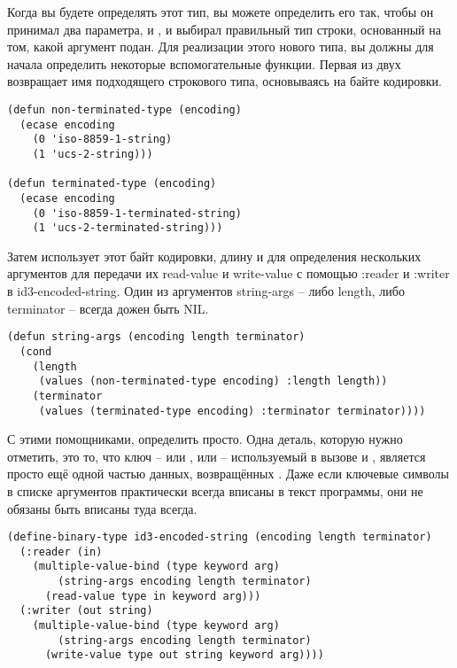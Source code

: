 Когда вы будете определять этот тип, вы можете определить его так, чтобы он принимал два
параметра,  и , и выбирал правильный тип строки,
основанный на том, какой аргумент подан. Для реализации этого нового типа, вы должны для
начала определить некоторые вспомогательные функции. Первая из двух возвращает имя
подходящего строкового типа, основываясь на байте кодировки.

\begin{lstlisting}
(defun non-terminated-type (encoding)
  (ecase encoding
    (0 'iso-8859-1-string)
    (1 'ucs-2-string)))

(defun terminated-type (encoding)
  (ecase encoding
    (0 'iso-8859-1-terminated-string)
    (1 'ucs-2-terminated-string)))
\end{lstlisting}

Затем  использует этот байт кодировки, длину и  для
определения нескольких аргументов для передачи их read-value и write-value с помощью
:reader и :writer в id3-encoded-string. Один из аргументов string-args -- либо length,
либо terminator -- всегда дожен быть NIL.

\begin{lstlisting}
(defun string-args (encoding length terminator)
  (cond 
    (length
     (values (non-terminated-type encoding) :length length))
    (terminator
     (values (terminated-type encoding) :terminator terminator))))
\end{lstlisting}

С этими помощниками, определить  просто. Одна деталь, которую
нужно отметить, это то, что ключ -- или , или  --
используемый в вызове  и , является просто ещё одной
частью данных, возвращённых . Даже если ключевые символы в списке
аргументов практически всегда вписаны в текст программы, они не обязаны быть вписаны туда
всегда.

\begin{lstlisting}
(define-binary-type id3-encoded-string (encoding length terminator)
  (:reader (in) 
    (multiple-value-bind (type keyword arg)
        (string-args encoding length terminator)
      (read-value type in keyword arg)))
  (:writer (out string)
    (multiple-value-bind (type keyword arg)
        (string-args encoding length terminator)
      (write-value type out string keyword arg))))
\end{lstlisting}

